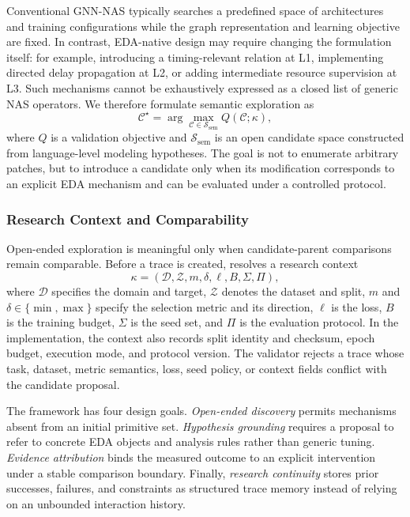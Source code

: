 Conventional GNN-NAS typically searches a predefined space of architectures and training configurations while the graph representation and learning objective are fixed. In contrast, EDA-native design may require changing the formulation itself: for example, introducing a timing-relevant relation at L1, implementing directed delay propagation at L2, or adding intermediate resource supervision at L3. Such mechanisms cannot be exhaustively expressed as a closed list of generic NAS operators. We therefore formulate semantic exploration as
\begin{equation}
    \mathcal{C}^{\star}=\arg\max_{\mathcal{C}\in\mathcal{S}_{\mathrm{sem}}}
    Q(\mathcal{C};\kappa),
    \label{eq:semantic_search}
\end{equation}
where $Q$ is a validation objective and $\mathcal{S}_{\mathrm{sem}}$ is an open candidate space constructed from language-level modeling hypotheses. The goal is not to enumerate arbitrary patches, but to introduce a candidate only when its modification corresponds to an explicit EDA mechanism and can be evaluated under a controlled protocol.

\subsubsection{Research Context and Comparability}

Open-ended exploration is meaningful only when candidate-parent comparisons remain comparable. Before a trace is created, \sysname resolves a research context
\begin{equation}
    \kappa=(\mathcal{D},\mathcal{Z},m,\delta,\ell,B,\Sigma,\Pi),
    \label{eq:research_context}
\end{equation}
where $\mathcal{D}$ specifies the domain and target, $\mathcal{Z}$ denotes the dataset and split, $m$ and $\delta\in\{\min,\max\}$ specify the selection metric and its direction, $\ell$ is the loss, $B$ is the training budget, $\Sigma$ is the seed set, and $\Pi$ is the evaluation protocol. In the implementation, the context also records split identity and checksum, epoch budget, execution mode, and protocol version. The validator rejects a trace whose task, dataset, metric semantics, loss, seed policy, or context fields conflict with the candidate proposal.

The framework has four design goals. \emph{Open-ended discovery} permits mechanisms absent from an initial primitive set. \emph{Hypothesis grounding} requires a proposal to refer to concrete EDA objects and analysis rules rather than generic tuning. \emph{Evidence attribution} binds the measured outcome to an explicit intervention under a stable comparison boundary. Finally, \emph{research continuity} stores prior successes, failures, and constraints as structured trace memory instead of relying on an unbounded interaction history.

